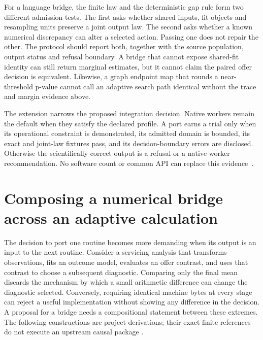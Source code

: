 For a language bridge, the finite law and the deterministic gap rule form two
different admission tests. The first asks whether shared inputs, fit objects
and resampling units preserve a joint output law. The second asks whether a
known numerical discrepancy can alter a selected action. Passing one does not
repair the other. The protocol should report both, together with the source
population, output status and refusal boundary. A bridge that cannot expose
shared-fit identity can still return marginal estimates, but it cannot claim
the paired offer decision is equivalent. Likewise, a graph endpoint map that
rounds a near-threshold p-value cannot call an adaptive search path identical
without the trace and margin evidence above.

The extension narrows the proposed integration decision. Native workers remain
the default when they satisfy the declared profile. A port earns a trial only
when its operational constraint is demonstrated, its admitted domain is
bounded, its exact and joint-law fixtures pass, and its decision-boundary
errors are disclosed. Otherwise the scientifically correct output is a
refusal or a native-worker recommendation. No software count or common API
can replace this evidence~\citep{exec17_s9_admission,exec17_s9_route_decisions}.

\section{Composing a numerical bridge across an adaptive calculation}
\label{exec17:s9-composition}

The decision to port one routine becomes more demanding when its output is
an input to the next routine. Consider a servicing analysis that transforms
observations, fits an outcome model, evaluates an offer contrast, and uses that
contrast to choose a subsequent diagnostic. Comparing only the final mean
discards the mechanism by which a small arithmetic difference can change the
diagnostic selected. Conversely, requiring identical machine bytes at every
stage can reject a useful implementation without showing any difference in
the decision. A proposal for a bridge needs a compositional statement between
these extremes. The following constructions are project derivations; their
exact finite references do not execute an upstream causal package
\citep{exec17_s9_composition}.

